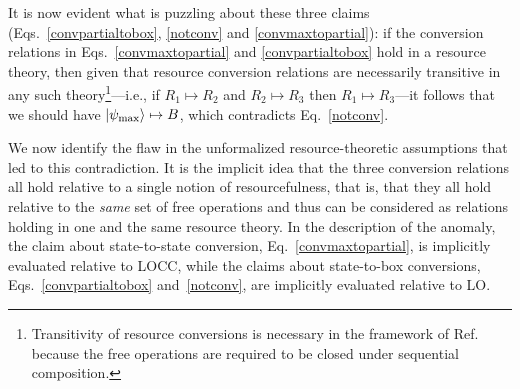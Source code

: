 \documentclass[prx,11pt,letterpaper,twocolumn,accepted=2023-11-27]{quantumarticle}
\newcommand{\ket}[1]{\left| #1 \right>}
\theoremstyle{plain}
\theoremstyle{definition}
\begin{document}
It is now evident what is puzzling about these three claims (Eqs.~\eqref{convpartialtobox}, \eqref{notconv} and \eqref{convmaxtopartial}): if the conversion relations in Eqs.~\eqref{convmaxtopartial} and \eqref{convpartialtobox} hold in a resource theory, then given that resource conversion relations are necessarily transitive in any such theory\footnote{Transitivity of resource conversions is necessary in the framework of Ref.~\cite{coecke2016mathematical} because the free operations are required to be closed under sequential composition.}---i.e., if $R_1 \mapsto R_2$ and $R_2 \mapsto R_3$ then $R_1 \mapsto R_3$---it follows that we should have $\ket{\psi_{\rm max}} \mapsto B$, which contradicts Eq.~\eqref{notconv}. 

We now identify the flaw in the unformalized resource-theoretic assumptions
 that led to this contradiction. 
   It is
the implicit idea that the three conversion relations all hold relative to a single notion of resourcefulness, that is, that they all hold relative to the {\em same} set of free operations and thus can be considered as relations holding in one and the same resource theory.
In the description of the anomaly,  the claim about state-to-state conversion,
 Eq.~\eqref{convmaxtopartial}, is implicitly evaluated relative to LOCC, while the claims about state-to-box conversions, Eqs.~\eqref{convpartialtobox} and~\eqref{notconv},
   are implicitly evaluated relative to LO. 
\end{document}

